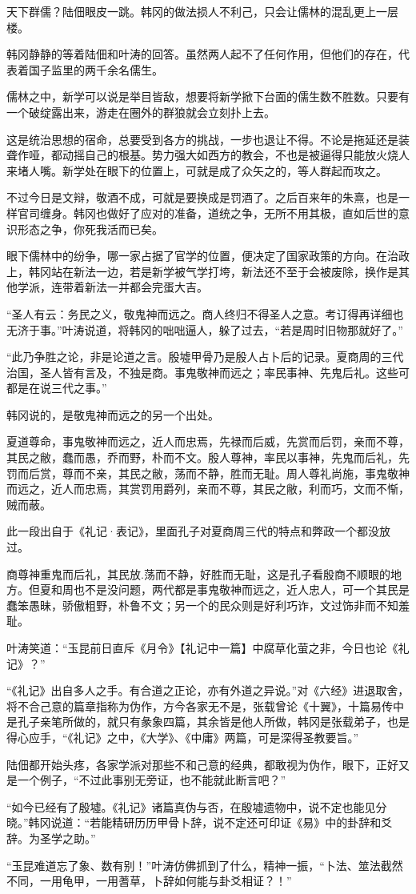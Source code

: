 天下群儒？陆佃眼皮一跳。韩冈的做法损人不利己，只会让儒林的混乱更上一层楼。

韩冈静静的等着陆佃和叶涛的回答。虽然两人起不了任何作用，但他们的存在，代表着国子监里的两千余名儒生。

儒林之中，新学可以说是举目皆敌，想要将新学掀下台面的儒生数不胜数。只要有一个破绽露出来，游走在圈外的群狼就会立刻扑上去。

这是统治思想的宿命，总要受到各方的挑战，一步也退让不得。不论是拖延还是装聋作哑，都动摇自己的根基。势力强大如西方的教会，不也是被逼得只能放火烧人来堵人嘴。新学处在眼下的位置上，可就是成了众矢之的，等人群起而攻之。

不过今日是文辩，敬酒不成，可就是要换成是罚酒了。之后百来年的朱熹，也是一样官司缠身。韩冈也做好了应对的准备，道统之争，无所不用其极，直如后世的意识形态之争，你死我活而已矣。

眼下儒林中的纷争，哪一家占据了官学的位置，便决定了国家政策的方向。在治政上，韩冈站在新法一边，若是新学被气学打垮，新法还不至于会被废除，换作是其他学派，连带着新法一并都会完蛋大吉。

“圣人有云：务民之义，敬鬼神而远之。商人终归不得圣人之意。考订得再详细也无济于事。”叶涛说道，将韩冈的咄咄逼人，躲了过去，“若是周时旧物那就好了。”

“此乃争胜之论，非是论道之言。殷墟甲骨乃是殷人占卜后的记录。夏商周的三代治国，圣人皆有言及，不独是商。事鬼敬神而远之；率民事神、先鬼后礼。这些可都是在说三代之事。”

韩冈说的，是敬鬼神而远之的另一个出处。

夏道尊命，事鬼敬神而远之，近人而忠焉，先禄而后威，先赏而后罚，亲而不尊，其民之敝，蠢而愚，乔而野，朴而不文。殷人尊神，率民以事神，先鬼而后礼，先罚而后赏，尊而不亲，其民之敝，荡而不静，胜而无耻。周人尊礼尚施，事鬼敬神而远之，近人而忠焉，其赏罚用爵列，亲而不尊，其民之敝，利而巧，文而不惭，贼而蔽。

此一段出自于《礼记·表记》，里面孔子对夏商周三代的特点和弊政一个都没放过。

商尊神重鬼而后礼，其民放.荡而不静，好胜而无耻，这是孔子看殷商不顺眼的地方。但夏和周也不是没问题，两代都是事鬼敬神而远之，近人忠人，可一个其民是蠢笨愚昧，骄傲粗野，朴鲁不文；另一个的民众则是好利巧诈，文过饰非而不知羞耻。

叶涛笑道：“玉昆前日直斥《月令》【礼记中一篇】中腐草化萤之非，今日也论《礼记》？”

“《礼记》出自多人之手。有合道之正论，亦有外道之异说。”对《六经》进退取舍，将不合己意的篇章指称为伪作，方今各家无不是，张载曾论《十翼》，十篇易传中是孔子亲笔所做的，就只有彖象四篇，其余皆是他人所做，韩冈是张载弟子，也是得心应手，“《礼记》之中，《大学》、《中庸》两篇，可是深得圣教要旨。”

陆佃都开始头疼，各家学派对那些不和己意的经典，都敢视为伪作，眼下，正好又是一个例子，“不过此事别无旁证，也不能就此断言吧？”

“如今已经有了殷墟。《礼记》诸篇真伪与否，在殷墟遗物中，说不定也能见分晓。”韩冈说道：“若能精研历历甲骨卜辞，说不定还可印证《易》中的卦辞和爻辞。为圣学之助。”

“玉昆难道忘了象、数有别！”叶涛仿佛抓到了什么，精神一振，“卜法、筮法截然不同，一用龟甲，一用蓍草，卜辞如何能与卦爻相证？！”

